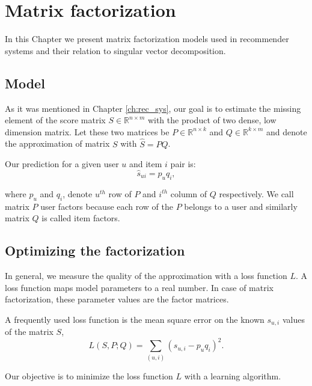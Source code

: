 \chapter{Matrix factorization}\label{ch:mf}
In this Chapter we present matrix factorization models used in recommender systems 
and their relation to singular vector decomposition. 

\section{Model} \label{sec:model}

As it was mentioned in Chapter \ref{ch:rec_sys}, our goal is to estimate the missing element of the 
score matrix $S\in\mathbb{R}^{n\times m}$ with the product of two dense, low dimension 
matrix. Let these two matrices be $P\in\mathbb{R}^{n\times k}$ and 
$Q\in\mathbb{R}^{k\times m}$ and denote the approximation of matrix $S$ with 
$\hat{S}=PQ$.

Our prediction for a given user $u$ and item $i$ pair is:
\[\hat{s}_{ui}=p_{u}q_{i},\]

where $p_u$ and $q_i$, denote $u^{th}$ row  of $P$ and  $i^{th}$ column of $Q$
respectively. We call matrix $P$ user factors because each row  of the $P$ belongs 
to a user and similarly matrix $Q$ is called item factors. 

\section{Optimizing the factorization}
In general, we measure the quality of the approximation with a loss function $L$. 
A loss function maps model parameters to a real number. In case of matrix factorization, these 
parameter values are the factor matrices.

A frequently used loss function is the mean square error on the known $s_{u,i}$ values 
of the matrix $S$,
\begin{equation}\label{eq:mse}
  L(S,P;Q)=\sum_{(u,i)}(s_{u,i}-p_{u}q_{i})^2.
\end{equation}


Our objective is to minimize the loss function $L$ with a learning algorithm.

